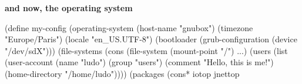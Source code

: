 \documentclass{beamer}
\begin{document}




\begin{frame}[plain]
  \huge{\textbf{and now, the operating system}}
\end{frame}

\begin{frame}
  \begin{semiverbatim}
(define my-config
  (\alert{operating-system}
   (host-name "gnubox")
   (timezone "Europe/Paris")
   (locale "en\_US.UTF-8")
   (bootloader (grub-configuration (device "/dev/sdX")))
   (file-systems (cons (file-system
                         (mount-point "/") \textrm{...})
   (users (list (user-account
                  (name "ludo") (group "users")
                  (comment "Hello, this is me!")
                  (home-directory "/home/ludo"))))
   (packages (cons* iotop jnettop %
  \end{semiverbatim}
\end{frame}
\end{document}
